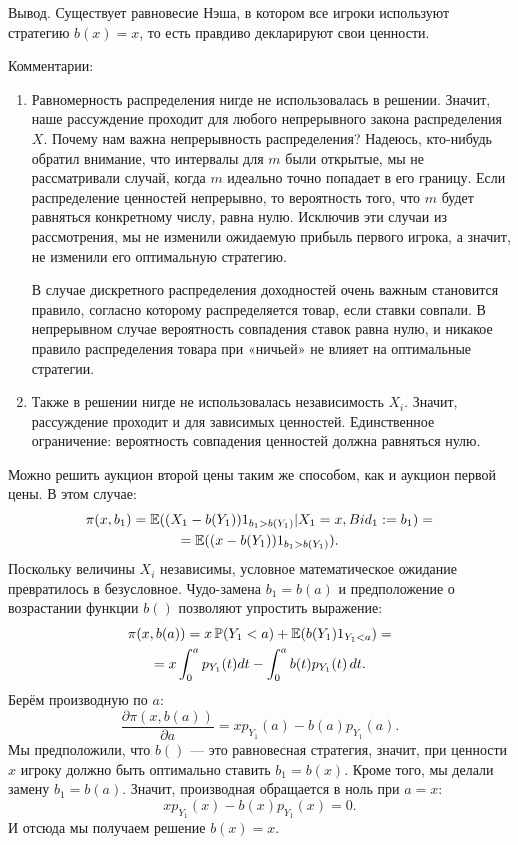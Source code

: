 \begin{enumerate}
Вывод. Существует равновесие Нэша, в котором все игроки используют стратегию $ b(x)=x $, то есть правдиво декларируют свои ценности.

Комментарии:
\begin{enumerate}
\item Равномерность распределения нигде не использовалась в решении. Значит, наше рассуждение проходит для любого непрерывного закона распределения $ X $.
Почему нам важна непрерывность распределения? Надеюсь, кто-нибудь обратил внимание, что интервалы для $ m $ были открытые, мы не рассматривали случай, когда $ m $ идеально точно попадает в его границу. Если распределение ценностей непрерывно, то вероятность того, что $ m $ будет равняться конкретному числу, равна нулю. Исключив эти случаи из рассмотрения, мы не изменили ожидаемую прибыль первого игрока, а значит, не изменили его оптимальную стратегию.

В случае дискретного распределения доходностей очень важным становится правило, согласно которому распределяется товар, если ставки совпали. В непрерывном случае вероятность совпадения ставок равна нулю, и никакое правило распределения товара при «ничьей» не влияет на оптимальные стратегии.
\item Также в решении нигде не использовалась независимость $ X_{i} $. Значит, рассуждение проходит и для зависимых ценностей. Единственное ограничение: вероятность совпадения ценностей должна равняться нулю.
\end{enumerate}


\begin{myex}
Можно решить аукцион второй цены таким же способом, как и аукцион первой цены. В этом случае:
\begin{multline}
\pi(x,b_{1})=\operatorname{\mathbb{E}}((X_{1}-b(Y_{1}))1_{b_{1}>b(Y_{1})}|X_{1}=x,Bid_{1}:=b_{1})=\\
=\operatorname{\mathbb{E}}((x-b(Y_{1}))1_{b_{1}>b(Y_{1})}).
\end{multline}
Поскольку величины $ X_{i} $ независимы, условное математическое ожидание превратилось в безусловное. Чудо-замена $b_{1}=b(a)$ и предположение о возрастании функции $ b() $ позволяют упростить выражение:
\begin{multline}
\pi(x,b(a))=x\operatorname{\mathbb{P}}(Y_{1}<a)+\operatorname{\mathbb{E}}(b(Y_{1})1_{Y_{1}<a})=\\
=x\int_{0}^{a}p_{Y_{1}}(t)dt-\int_{0}^{a}b(t)p_{Y_{1}}(t) \, dt.
\end{multline}
Берём производную по $ a $:
\begin{equation}
\frac{\partial \pi(x,b(a))}{\partial a}=xp_{Y_{1}}(a)-b(a)p_{Y_{1}}(a).
\end{equation}
Мы предположили, что $ b() $ — это равновесная стратегия, значит, при ценности $ x $ игроку должно быть оптимально ставить $ b_{1}=b(x) $. Кроме того, мы делали замену $ b_{1}=b(a) $. Значит, производная обращается в ноль при $ a=x $:
\begin{equation}
xp_{Y_{1}}(x)-b(x)p_{Y_{1}}(x)=0.
\end{equation}
И отсюда мы получаем решение $b(x)=x$.


\end{myex}
\end{enumerate}
